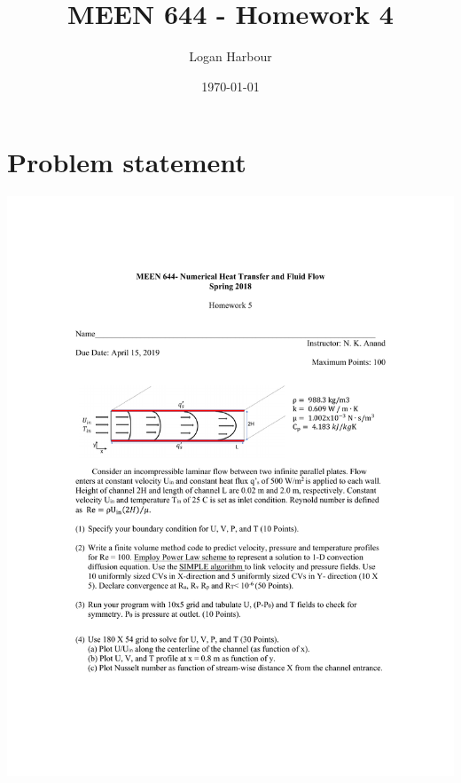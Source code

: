 \documentclass{article}
\newcommand{\pageTitle}{MEEN 644 - Homework 4}
\newcommand{\pageAuthor}{Logan Harbour}
\begin{document}
\title{\LARGE \textbf{\pageTitle} \vspace{-0.3cm}}
\author{\large \pageAuthor}
\date{\vspace{-0.6cm} \large \today \vspace{-0.4cm}}

\maketitle

\section{Problem statement}

\begin{center}
	\includegraphics[trim={3.6cm 15.5cm 4cm 9.0cm},clip,page=1,scale=0.8]{../doc/hwk5.pdf}
\end{center}
\end{document}
